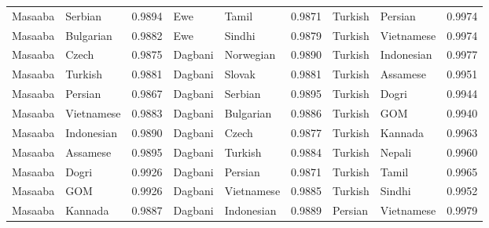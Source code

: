 \documentclass[11pt]{article} %
\begin{document}
\begin{table}
\begin{tabular}{llr@{\hspace{12pt}}llr@{\hspace{12pt}}llr}
            Masaaba                      & Serbian             & 0.9894        & Ewe                 & Tamil               & 0.9871        & Turkish             & Persian             & 0.9974        \\
            Masaaba                      & Bulgarian           & 0.9882        & Ewe                 & Sindhi              & 0.9879        & Turkish             & Vietnamese          & 0.9974        \\
            Masaaba                      & Czech               & 0.9875        & Dagbani             & Norwegian           & 0.9890        & Turkish             & Indonesian          & 0.9977        \\
            Masaaba                      & Turkish             & 0.9881        & Dagbani             & Slovak              & 0.9881        & Turkish             & Assamese            & 0.9951        \\
            Masaaba                      & Persian             & 0.9867        & Dagbani             & Serbian             & 0.9895        & Turkish             & Dogri               & 0.9944        \\
            Masaaba                      & Vietnamese          & 0.9883        & Dagbani             & Bulgarian           & 0.9886        & Turkish             & GOM                 & 0.9940        \\
            Masaaba                      & Indonesian          & 0.9890        & Dagbani             & Czech               & 0.9877        & Turkish             & Kannada             & 0.9963        \\
            Masaaba                      & Assamese            & 0.9895        & Dagbani             & Turkish             & 0.9884        & Turkish             & Nepali              & 0.9960        \\
            Masaaba                      & Dogri               & 0.9926        & Dagbani             & Persian             & 0.9871        & Turkish             & Tamil               & 0.9965        \\
            Masaaba                      & GOM                 & 0.9926        & Dagbani             & Vietnamese          & 0.9885        & Turkish             & Sindhi              & 0.9952        \\
            Masaaba                      & Kannada             & 0.9887        & Dagbani             & Indonesian          & 0.9889        & Persian             & Vietnamese          & 0.9979        \\

\end{tabular}
\end{table}
\end{document}
